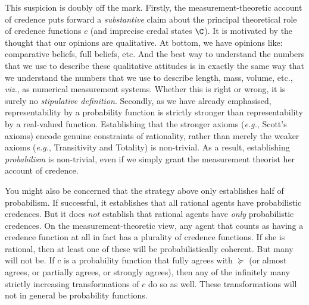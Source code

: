This suspicion is doubly off the mark. Firstly, the measurement-theoretic account of credence puts forward a \textit{substantive} claim about the principal theoretical role of credence functions $c$ (and imprecise credal states $\C$). It is motivated by the thought that our opinions are qualitative. At bottom, we have opinions like: comparative beliefs, full beliefs, etc. And the best way to understand the numbers that we use to describe these qualitative attitudes is in exactly the same way that we understand the numbers that we use to describe length, mass, volume, etc., \textit{viz.}, as numerical measurement systems. Whether this is right or wrong, it is surely no \textit{stipulative definition}. Secondly, as we have already emphasised, representability by a probability function is strictly stronger than representability by a real-valued function. Establishing that the stronger axioms (\textit{e.g.}, Scott's axioms) encode genuine constraints of rationality, rather than merely the weaker axioms (\textit{e.g.}, Transitivity and Totality) is non-trivial. As a result, establishing \textit{probabilism} is non-trivial, even if we simply grant the measurement theorist her account of credence.

You might also be concerned that the strategy above only establishes half of probabilism. If successful, it establishes that all rational agents have probabilistic credences. But it does \textit{not} establish that rational agents have \textit{only} probabilistic credences. On the measurement-theoretic view, any agent that counts as having a credence function at all in fact has a plurality of credence functions. If she is rational, then at least one of these will be probabilistically coherent. But many will not be. If $c$ is a probability function that fully agrees with $\succeq$ (or almost agrees, or partially agrees, or strongly agrees), then any of the infinitely many strictly increasing transformations of $c$ do so as well. These transformations will not in general be probability functions.

